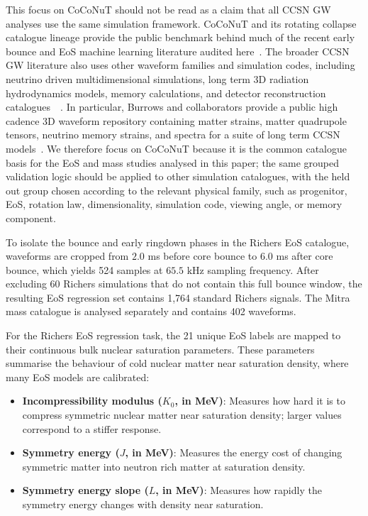 \documentclass[reprint,aps,prd,floatfix,nofootinbib,superscriptaddress,showpacs]{revtex4-2}
\begin{document}
This focus on CoCoNuT should not be read as a claim that all CCSN GW analyses use the same simulation framework. CoCoNuT and its rotating collapse catalogue lineage provide the public benchmark behind much of the recent early bounce and EoS machine learning literature audited here~\cite{richers2017,edwards2021,mitra2022,mitra2024,nunes2024,pastormarcos2024}. The broader CCSN GW literature also uses other waveform families and simulation codes, including neutrino driven multidimensional simulations, long term 3D radiation hydrodynamics models, memory calculations, and detector reconstruction catalogues~\cite{oconnor2018,gossan2016,szczepanczyk2021}~\cite{vartanyan2023,choi2024,burrows2024}. In particular, Burrows and collaborators provide a public high cadence 3D waveform repository containing matter strains, matter quadrupole tensors, neutrino memory strains, and spectra for a suite of long term CCSN models~\cite{burrowsGWData}. We therefore focus on CoCoNuT because it is the common catalogue basis for the EoS and mass studies analysed in this paper; the same grouped validation logic should be applied to other simulation catalogues, with the held out group chosen according to the relevant physical family, such as progenitor, EoS, rotation law, dimensionality, simulation code, viewing angle, or memory component.

To isolate the bounce and early ringdown phases in the Richers EoS catalogue, waveforms are cropped from $2.0$ ms before core bounce to $6.0$ ms after core bounce, which yields 524 samples at $65.5\text{ kHz}$ sampling frequency. After excluding 60 Richers simulations that do not contain this full bounce window, the resulting EoS regression set contains 1,764 standard Richers signals. The Mitra mass catalogue is analysed separately and contains 402 waveforms.

For the Richers EoS regression task, the 21 unique EoS labels are mapped to their continuous bulk nuclear saturation parameters. These parameters summarise the behaviour of cold nuclear matter near saturation density, where many EoS models are calibrated:
\begin{itemize}
    \item \textbf{Incompressibility modulus ($K_0$, in MeV)}: Measures how hard it is to compress symmetric nuclear matter near saturation density; larger values correspond to a stiffer response.
    \item \textbf{Symmetry energy ($J$, in MeV)}: Measures the energy cost of changing symmetric matter into neutron rich matter at saturation density.
    \item \textbf{Symmetry energy slope ($L$, in MeV)}: Measures how rapidly the symmetry energy changes with density near saturation.
\end{itemize}
\end{document}

